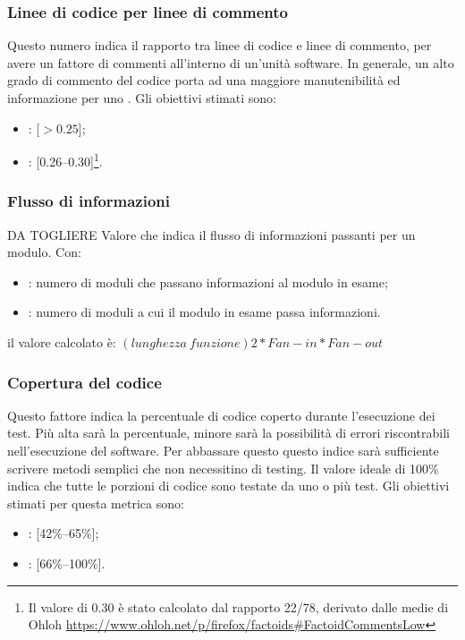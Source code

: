 \subsubsection{Linee di codice per linee di commento}
\label{4.2.5}
Questo numero indica il rapporto tra linee di codice e linee di commento, per avere un fattore di commenti all'interno di un'unità software. In generale, un alto grado di commento del codice porta ad una maggiore manutenibilità ed informazione per uno .
Gli obiettivi stimati sono:
\begin{itemize}
\item {}: [$>0.25$];
\item {}: [0.26--0.30]\footnote{Il valore di 0.30 è stato calcolato dal rapporto 22/78, derivato dalle medie di Ohloh \url{https://www.ohloh.net/p/firefox/factoids\#FactoidCommentsLow}}.
\end{itemize}

\subsubsection{Flusso di informazioni}DA TOGLIERE
\label{4.2.6}
Valore che indica il flusso di informazioni passanti per un modulo.
Con:
\begin{itemize}
\item {}: numero di moduli che passano informazioni al modulo in esame;
\item {}: numero di moduli a cui il modulo in esame passa informazioni.
\end{itemize}
il valore calcolato è:
\begin{math}(lunghezza\:funzione)2 * Fan-in * Fan-out\end{math}

\subsubsection{Copertura del codice}
\label{4.2.9}
Questo fattore indica la percentuale di codice coperto durante l'esecuzione dei test. Più alta sarà la percentuale, minore sarà la possibilità di errori riscontrabili nell'esecuzione del software. Per abbassare questo questo indice sarà sufficiente scrivere metodi semplici che non necessitino di testing. Il valore ideale di 100\% indica che tutte le porzioni di codice sono testate da uno o più test.
Gli obiettivi stimati per questa metrica sono:
\begin{itemize}
\item {}: [42\%--65\%];
\item {}: [66\%--100\%].
\end{itemize}

